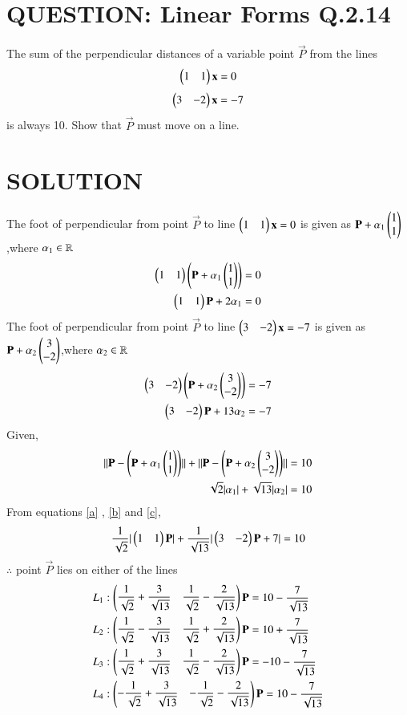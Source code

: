 \documentclass[journal,12pt,twocolumn]{IEEEtran}
\begin{document}
\section{QUESTION: Linear Forms Q.2.14}
The sum of the perpendicular distances of a variable point $\vec{P}$ from the lines 
$$\begin{pmatrix}1&1\end{pmatrix} \mathbf{x} = 0$$
$$\begin{pmatrix}3&-2\end{pmatrix} \mathbf{x} = -7$$
is always 10. Show that $\vec{P}$ must move on a line.

\section{SOLUTION}
The foot of perpendicular from point $\vec{P}$ to line $\begin{pmatrix}1&1\end{pmatrix} \mathbf{x} = 0$ is given as $\mathbf{P} + \alpha_{1}\begin{pmatrix}1\\1\end{pmatrix}$,where $\alpha_{1} \in \mathbb{R}$
\begin{align}
 \begin{pmatrix}1&1\end{pmatrix} \left(\mathbf{P} + \alpha_{1}\begin{pmatrix}1\\1\end{pmatrix}\right) = 0\\
 \begin{pmatrix}1&1\end{pmatrix}\mathbf{P} + 2\alpha_{1} =0 \label{a}
\end{align}
The foot of perpendicular from point $\vec{P}$ to line $\begin{pmatrix}3&-2\end{pmatrix} \mathbf{x} = -7$ is given as $\mathbf{P} + \alpha_{2}\begin{pmatrix}3\\-2\end{pmatrix}$,where $\alpha_{2} \in \mathbb{R}$
\begin{align}
\begin{pmatrix}3&-2\end{pmatrix} \left(\mathbf{P} + \alpha_{2}\begin{pmatrix}3\\-2\end{pmatrix}\right) = -7\\
 \begin{pmatrix}3&-2\end{pmatrix}\mathbf{P} + 13\alpha_{2} =-7 \label{b}
\end{align}
Given,
\begin{align}
\lVert\mathbf{P} - \left(\mathbf{P} + \alpha_{1}\begin{pmatrix}1\\1\end{pmatrix}\right)\rVert + \lVert\mathbf{P} -  \left(\mathbf{P} + \alpha_{2}\begin{pmatrix}3\\-2\end{pmatrix}\right)\rVert =10 \\
\sqrt{2} \vert\alpha_{1}\vert + \sqrt{13} \vert\alpha_{2}\vert =10 \label{c}
\end{align}
From equations \eqref{a} , \eqref{b} and \eqref{c},
\begin{align}
\dfrac{1}{\sqrt{2}} \vert\begin{pmatrix}1&1\end{pmatrix}\mathbf{P}\vert + \dfrac{1}{\sqrt{13}} \vert\begin{pmatrix}3&-2\end{pmatrix}\mathbf{P} +7\vert = 10
\end{align}
$\therefore$ point $\vec{P}$ lies on either of the lines
\begin{align}
L_1&:\begin{pmatrix}\dfrac{1}{\sqrt{2}}+\dfrac{3}{\sqrt{13}}& \dfrac{1}{\sqrt{2}}-\dfrac{2}{\sqrt{13}}\end{pmatrix}\mathbf{P} = 10 - \dfrac{7}{\sqrt{13}}\\
L_2&:\begin{pmatrix}\dfrac{1}{\sqrt{2}}-\dfrac{3}{\sqrt{13}}& \dfrac{1}{\sqrt{2}}+\dfrac{2}{\sqrt{13}}\end{pmatrix}\mathbf{P} = 10 + \dfrac{7}{\sqrt{13}}\\
L_3&:\begin{pmatrix}\dfrac{1}{\sqrt{2}}+\dfrac{3}{\sqrt{13}}& \dfrac{1}{\sqrt{2}}-\dfrac{2}{\sqrt{13}}\end{pmatrix}\mathbf{P} = -10 - \dfrac{7}{\sqrt{13}}\\
L_4&:\begin{pmatrix}-\dfrac{1}{\sqrt{2}}+\dfrac{3}{\sqrt{13}}& -\dfrac{1}{\sqrt{2}}-\dfrac{2}{\sqrt{13}}\end{pmatrix}\mathbf{P} = 10 - \dfrac{7}{\sqrt{13}}
\end{align}
\end{document}
